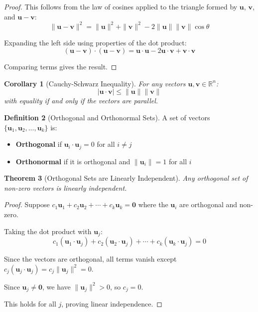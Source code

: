 \documentclass[12pt]{article}
\numberwithin{equation}{section}
\newcommand{\vect}[1]{\boldsymbol{#1}}   %
\theoremstyle{plain}
\newtheorem{theorem}{Theorem}[section]
\newtheorem{corollary}[theorem]{Corollary}
\theoremstyle{definition}
\newtheorem{definition}[theorem]{Definition}
\theoremstyle{remark}
\begin{document}
\begin{proof}
This follows from the law of cosines applied to the triangle formed by $\vect{u}$, $\vect{v}$, and $\vect{u} - \vect{v}$:
$$\|\vect{u} - \vect{v}\|^2 = \|\vect{u}\|^2 + \|\vect{v}\|^2 - 2\|\vect{u}\|\|\vect{v}\|\cos\theta$$

Expanding the left side using properties of the dot product:
$$(\vect{u} - \vect{v}) \cdot (\vect{u} - \vect{v}) = \vect{u} \cdot \vect{u} - 2\vect{u} \cdot \vect{v} + \vect{v} \cdot \vect{v}$$

Comparing terms gives the result.
\end{proof}

\begin{corollary}[Cauchy-Schwarz Inequality]
For any vectors $\vect{u}, \vect{v} \in \mathbb{R}^n$:
$$|\vect{u} \cdot \vect{v}| \leq \|\vect{u}\|\|\vect{v}\|$$
with equality if and only if the vectors are parallel.
\end{corollary}

\begin{definition}[Orthogonal and Orthonormal Sets]
A set of vectors $\{\vect{u}_1, \vect{u}_2, \ldots, \vect{u}_k\}$ is:
\begin{itemize}
\item \textbf{Orthogonal} if $\vect{u}_i \cdot \vect{u}_j = 0$ for all $i \neq j$
\item \textbf{Orthonormal} if it is orthogonal and $\|\vect{u}_i\| = 1$ for all $i$
\end{itemize}
\end{definition}

\begin{theorem}[Orthogonal Sets are Linearly Independent]
Any orthogonal set of non-zero vectors is linearly independent.
\end{theorem}

\begin{proof}
Suppose $c_1\vect{u}_1 + c_2\vect{u}_2 + \cdots + c_k\vect{u}_k = \vect{0}$ where the $\vect{u}_i$ are orthogonal and non-zero.

Taking the dot product with $\vect{u}_j$:
$$c_1(\vect{u}_1 \cdot \vect{u}_j) + c_2(\vect{u}_2 \cdot \vect{u}_j) + \cdots + c_k(\vect{u}_k \cdot \vect{u}_j) = 0$$

Since the vectors are orthogonal, all terms vanish except $c_j(\vect{u}_j \cdot \vect{u}_j) = c_j\|\vect{u}_j\|^2 = 0$.

Since $\vect{u}_j \neq \vect{0}$, we have $\|\vect{u}_j\|^2 > 0$, so $c_j = 0$.

This holds for all $j$, proving linear independence.
\end{proof}
\end{document}
